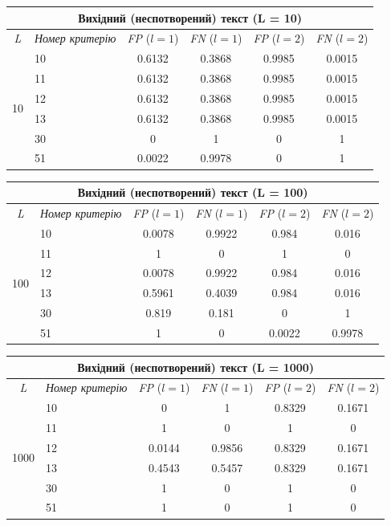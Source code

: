 \documentclass[a4paper,12pt]{article}
\begin{document}
\begin{center}
\renewcommand{\arraystretch}{1.2}
\setlength{\tabcolsep}{6pt}
\begin{tabular}{|c|l||c|c||c|c|}
\hline
\multicolumn{6}{|c|}{Вихідний (неспотворений) текст (L = 10)} \\
\hline
\textit{L} & \textit{Номер критерію} & \textit{FP} ($l=1$) & \textit{FN} ($l=1$) & \textit{FP} ($l=2$) & \textit{FN} ($l=2$) \\
\hline
\multirow{6}{*}{10} & 10 & 0.6132 & 0.3868 & 0.9985 & 0.0015 \\
 & 11 & 0.6132 & 0.3868 & 0.9985 & 0.0015 \\
 & 12 & 0.6132 & 0.3868 & 0.9985 & 0.0015 \\
 & 13 & 0.6132 & 0.3868 & 0.9985 & 0.0015 \\
 & 30 & 0 & 1 & 0 & 1 \\
 & 51 & 0.0022 & 0.9978 & 0 & 1 \\
\hline
\end{tabular}
\end{center}

\begin{center}
\renewcommand{\arraystretch}{1.2}
\setlength{\tabcolsep}{6pt}
\begin{tabular}{|c|l||c|c||c|c|}
\hline
\multicolumn{6}{|c|}{Вихідний (неспотворений) текст (L = 100)} \\
\hline
\textit{L} & \textit{Номер критерію} & \textit{FP} ($l=1$) & \textit{FN} ($l=1$) & \textit{FP} ($l=2$) & \textit{FN} ($l=2$) \\
\hline
\multirow{6}{*}{100} & 10 & 0.0078 & 0.9922 & 0.984 & 0.016 \\
 & 11 & 1 & 0 & 1 & 0 \\
 & 12 & 0.0078 & 0.9922 & 0.984 & 0.016 \\
 & 13 & 0.5961 & 0.4039 & 0.984 & 0.016 \\
 & 30 & 0.819 & 0.181 & 0 & 1 \\
 & 51 & 1 & 0 & 0.0022 & 0.9978 \\
\hline
\end{tabular}
\end{center}

\begin{center}
\renewcommand{\arraystretch}{1.2}
\setlength{\tabcolsep}{6pt}
\begin{tabular}{|c|l||c|c||c|c|}
\hline
\multicolumn{6}{|c|}{Вихідний (неспотворений) текст (L = 1000)} \\
\hline
\textit{L} & \textit{Номер критерію} & \textit{FP} ($l=1$) & \textit{FN} ($l=1$) & \textit{FP} ($l=2$) & \textit{FN} ($l=2$) \\
\hline
\multirow{6}{*}{1000} & 10 & 0 & 1 & 0.8329 & 0.1671 \\
 & 11 & 1 & 0 & 1 & 0 \\
 & 12 & 0.0144 & 0.9856 & 0.8329 & 0.1671 \\
 & 13 & 0.4543 & 0.5457 & 0.8329 & 0.1671 \\
 & 30 & 1 & 0 & 1 & 0 \\
 & 51 & 1 & 0 & 1 & 0 \\
\hline
\end{tabular}
\end{center}
\end{document}
